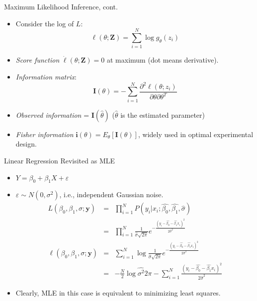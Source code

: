 \documentclass[aspectratio=169]{beamer}
\let \vec \mathbf
\begin{document}
\begin{frame}{Maximum Likelihood Inference, cont.}
    \begin{itemize}
        \item Consider the log of $L$:
        \begin{equation*}
            \ell(\theta; \vec{Z}) = \sum_{i=1}^N \log{g_{\theta}(z_i)}
        \end{equation*}
        \item \textit{Score function} $\dot{\ell}(\theta; \vec{Z}) = 0$ at maximum (dot means derivative).
        \item \textit{Information matrix}:
        \begin{equation*}
            \vec{I}(\theta) = -\sum_{i=1}^N\frac{\partial^2 \ell(\theta;z_i)}{\partial \theta \partial \theta^T}
        \end{equation*}
        \item \textit{Observed information} = $\vec{I}(\hat{\theta})$ ($\hat{\theta}$ is the estimated parameter)
        \item \textit{Fisher information} $\vec{i}(\theta) = E_{\theta}[\vec{I}(\theta)]$, widely used in optimal experimental design.
    \end{itemize}
\end{frame}


\begin{frame}{Linear Regression Revisited as MLE}
    \begin{itemize}
        \item $Y = \beta_0 + \beta_1 X + \varepsilon$
        \item $\varepsilon \sim N(0, \sigma^2)$, i.e., independent Gaussian noise.
        \begin{eqnarray*}
        L(\beta_0, \beta_1, \sigma; \vec{y}) &= & \prod_{i=1}^N P(y_i|x_i;\hat{\beta_0},\hat{\beta_1}, \hat{\sigma})\\
        & = &\prod_{i=1}^N \frac{1}{\hat{\sigma}\sqrt{2\pi}} e^{-\frac{(y_i-\hat{\beta_0} - \hat{\beta_1}x_i)^2}{2\hat{\sigma}^2}}\\
        \ell(\beta_0, \beta_1, \sigma; \vec{y})& = & \sum_{i=1}^N \log{\frac{1}{\hat{\sigma}\sqrt{2\pi}} e^{-\frac{(y_i-\hat{\beta_0} - \hat{\beta_1}x_i)^2}{2\hat{\sigma}^2}}}\\
        & = & -\frac{N}{2}\log{\hat{\sigma^2}2\pi} - \sum_{i=1}^N \frac{(y_i-\hat{\beta_0} - \hat{\beta_1}x_i)^2}{2\hat{\sigma}^2}
        \end{eqnarray*}
        \item Clearly, MLE in this case is equivalent to minimizing least squares.
    \end{itemize}
\end{frame}
\end{document}
